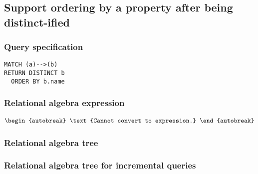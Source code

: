 
\subsection{Support ordering by a property after being distinct-ified}

\subsubsection*{Query specification}

\begin{lstlisting}
MATCH (a)-->(b)
RETURN DISTINCT b
  ORDER BY b.name
\end{lstlisting}

\subsubsection*{Relational algebra expression}

\begin{align*}
\begin{autobreak}
\text{Cannot convert to expression.}
\end{autobreak}
\end{align*}

\subsubsection*{Relational algebra tree}


\subsubsection*{Relational algebra tree for incremental queries}


